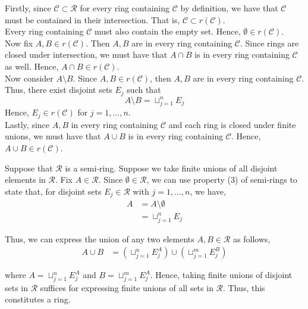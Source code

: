 \documentclass[12pt]{article}
\newenvironment{problem}[2][Problem]{\begin{trivlist}
\item[\hskip \labelsep {\bfseries #1}\hskip \labelsep {\bfseries #2.}]}{\end{trivlist}}
\begin{document}
Firstly, since $\mathcal{C} \subset \mathcal{R}$ for every ring containing $\mathcal{C}$ by definition, we have that $\mathcal{C}$ must be contained in their intersection. That is, $\mathcal{C} \subset r(\mathcal{C})$.\\

Every ring containing $\mathcal{C}$ must also contain the empty set. Hence, $\emptyset \in r(\mathcal{C})$.\\

Now fix $A, B \in r(\mathcal{C})$. Then $A, B$ are in every ring containing $\mathcal{C}$. Since rings are closed under intersection, we must have that $A \cap B$ is in every ring containing $\mathcal{C}$ as well. Hence, $A \cap B \in r(\mathcal{C})$.\\

Now consider $A \setminus B$. Since $A, B \in r(\mathcal{C})$, then $A, B$ are in every ring containing $\mathcal{C}$. Thus, there exist disjoint sets $E_j$ such that $$A \setminus B = \sqcup_{j=1}^n E_j$$ Hence, $E_j \in r(\mathcal{C})$ for $j = 1, \ldots, n$.\\

Lastly, since $A, B$ in every ring containing $\mathcal{C}$ and each ring is closed under finite unions, we must have that $A \cup B$ is in every ring containing $\mathcal{C}$. Hence, $A \cup B \in r(\mathcal{C})$.

\begin{problem}{7}
\end{problem}

Suppose that $\mathcal{R}$ is a semi-ring. Suppose we take finite unions of all disjoint elements in $\mathcal{R}$. Fix $A \in \mathcal{R}$. Since $\emptyset \in \mathcal{R}$, we can use property (3) of semi-rings to state that, for disjoint sets $E_j \in \mathcal{R}$ with $j = 1, \ldots, n$, we have,
\begin{align*}
A &= A \setminus \emptyset\\
&= \sqcup_{j=1}^n E_j
\end{align*}

Thus, we can express the union of any two elements $A, B \in \mathcal{R}$ as follows,
\begin{align*}
A \cup B &= (\sqcup_{j=1}^n E_j^A) \cup (\sqcup_{j=1}^m E_j^B)
\end{align*}

where $A = \sqcup_{j=1}^n E_j^A$ and $B = \sqcup_{j=1}^m E_j^A$. Hence, taking finite unions of disjoint sets in $\mathcal{R}$ suffices for expressing finite unions of all sets in $\mathcal{R}$. Thus, this constitutes a ring.\\
\end{document}
